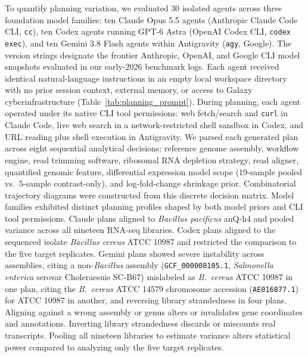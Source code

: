 \documentclass[11pt,letterpaper]{article}
\begin{document}
To quantify planning variation, we evaluated 30 isolated agents across three foundation model families: ten Claude Opus 5.5 agents (Anthropic Claude Code CLI, \texttt{cc}), ten Codex agents running GPT-6 Astra (OpenAI Codex CLI, \texttt{codex exec}), and ten Gemini 3.8 Flash agents within Antigravity (\texttt{agy}, Google). The version strings designate the frontier Anthropic, OpenAI, and Google CLI model snapshots evaluated in our early-2026 benchmark logs. Each agent received identical natural-language instructions in an empty local workspace directory with no prior session context, external memory, or access to Galaxy cyberinfrastructure (Table~\ref{tab:planning_prompt}). During planning, each agent operated under its native CLI tool permissions: web fetch/search and \texttt{curl} in Claude Code, live web search in a network-restricted shell sandbox in Codex, and URL reading plus shell execution in Antigravity. We parsed each generated plan across eight sequential analytical decisions: reference genome assembly, workflow engine, read trimming software, ribosomal RNA depletion strategy, read aligner, quantified genomic feature, differential expression model scope (19-sample pooled vs.\ 5-sample contrast-only), and log-fold-change shrinkage prior. Combinatorial trajectory diagrams were constructed from this discrete decision matrix. Model families exhibited distinct planning profiles shaped by both model priors and CLI tool permissions. Claude plans aligned to \textit{Bacillus pacificus} anQ-h4 and pooled variance across all nineteen RNA-seq libraries. Codex plans aligned to the sequenced isolate \textit{Bacillus cereus} ATCC 10987 and restricted the comparison to the five target replicates. Gemini plans showed severe instability across assemblies, citing a non-\textit{Bacillus} assembly (\texttt{GCF\_000008105.1}, \textit{Salmonella enterica} serovar Choleraesuis SC-B67) mislabeled as \textit{B.\ cereus} ATCC 10987 in one plan, citing the \textit{B.\ cereus} ATCC 14579 chromosome accession (\texttt{AE016877.1}) for ATCC 10987 in another, and reversing library strandedness in four plans. Aligning against a wrong assembly or genus alters or invalidates gene coordinates and annotations. Inverting library strandedness discards or miscounts real transcripts. Pooling all nineteen libraries to estimate variance alters statistical power compared to analyzing only the five target replicates.
\end{document}

